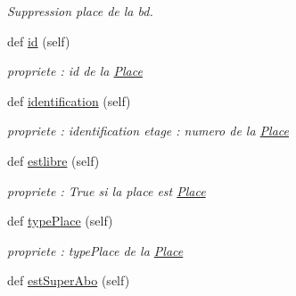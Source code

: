 \begin{DoxyCompactItemize}
\begin{DoxyCompactList}\small\item\em Suppression place de la bd. \end{DoxyCompactList}\item 
\hypertarget{classsrc_1_1m_1_1_parking_1_1_place_acfbc5f8319d8f007e8ecd4adae7f6692}{}def \hyperlink{classsrc_1_1m_1_1_parking_1_1_place_acfbc5f8319d8f007e8ecd4adae7f6692}{id} (self)\label{classsrc_1_1m_1_1_parking_1_1_place_acfbc5f8319d8f007e8ecd4adae7f6692}

\begin{DoxyCompactList}\small\item\em propriete \+: id de la \hyperlink{classsrc_1_1m_1_1_parking_1_1_place}{Place} \end{DoxyCompactList}\item 
\hypertarget{classsrc_1_1m_1_1_parking_1_1_place_ab1b18f02fd206dbfe45c6fd06bbdc7fe}{}def \hyperlink{classsrc_1_1m_1_1_parking_1_1_place_ab1b18f02fd206dbfe45c6fd06bbdc7fe}{identification} (self)\label{classsrc_1_1m_1_1_parking_1_1_place_ab1b18f02fd206dbfe45c6fd06bbdc7fe}

\begin{DoxyCompactList}\small\item\em propriete \+: identification etage \+: numero de la \hyperlink{classsrc_1_1m_1_1_parking_1_1_place}{Place} \end{DoxyCompactList}\item 
\hypertarget{classsrc_1_1m_1_1_parking_1_1_place_a5062534209de557f91ce1fee48f711f3}{}def \hyperlink{classsrc_1_1m_1_1_parking_1_1_place_a5062534209de557f91ce1fee48f711f3}{estlibre} (self)\label{classsrc_1_1m_1_1_parking_1_1_place_a5062534209de557f91ce1fee48f711f3}

\begin{DoxyCompactList}\small\item\em propriete \+: True si la place est \hyperlink{classsrc_1_1m_1_1_parking_1_1_place}{Place} \end{DoxyCompactList}\item 
\hypertarget{classsrc_1_1m_1_1_parking_1_1_place_adcd4af26672f2108f03aa9e49cc75f7e}{}def \hyperlink{classsrc_1_1m_1_1_parking_1_1_place_adcd4af26672f2108f03aa9e49cc75f7e}{type\+Place} (self)\label{classsrc_1_1m_1_1_parking_1_1_place_adcd4af26672f2108f03aa9e49cc75f7e}

\begin{DoxyCompactList}\small\item\em propriete \+: type\+Place de la \hyperlink{classsrc_1_1m_1_1_parking_1_1_place}{Place} \end{DoxyCompactList}\item 
\hypertarget{classsrc_1_1m_1_1_parking_1_1_place_aa982e2706ec845c0dd760f7eff8e5ed5}{}def \hyperlink{classsrc_1_1m_1_1_parking_1_1_place_aa982e2706ec845c0dd760f7eff8e5ed5}{est\+Super\+Abo} (self)\label{classsrc_1_1m_1_1_parking_1_1_place_aa982e2706ec845c0dd760f7eff8e5ed5}


\end{DoxyCompactItemize}
